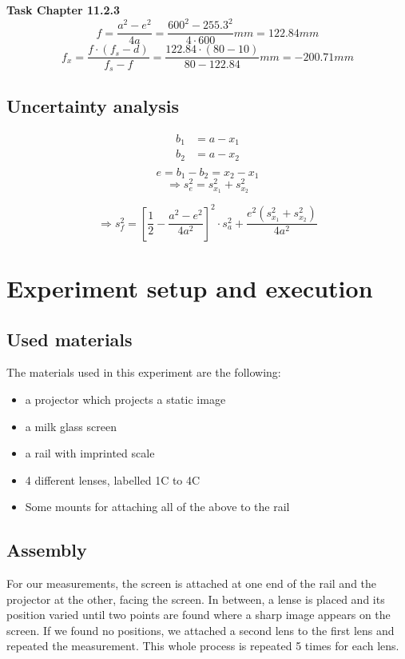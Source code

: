 \documentclass{scrreprt}
\begin{document}
\textbf{Task Chapter 11.2.3}
\begin{equation}
f = \frac{a^2-e^2}{4a} = \frac{600^2-255.3^2}{4\cdot 600}mm = 122.84mm
\end{equation}
\begin{equation}
f_x = \frac{f \cdot (f_s-d)}{f_s-f} = \frac{122.84\cdot (80-10)}{80-122.84}mm = -200.71mm
\end{equation}

\subsection{Uncertainty analysis}
\begin{align*}
b_1 &= a - x_1\\
b_2 &= a - x_2\\
\end{align*}
\[e = b_1 - b_2 = x_2 - x_1\]
\begin{equation}
\Longrightarrow s_e^2 = s_{x_1}^2 + s_{x_2}^2
\end{equation}

\begin{equation}
\Longrightarrow s_f^2 = \left[ \frac{1}{2} - \frac{a^2-e^2}{4 a^2} \right]^2 \cdot s_a^2 + \frac{e^2 \left( s_{x_1}^2 + s_{x_2}^2 \right)}{4  a^2}
\end{equation}

\section{Experiment setup and execution}

\subsection{Used materials}
The materials used in this experiment are the following:
\begin{itemize}
\item a projector which projects a static image
\item a milk glass screen
\item a rail with imprinted scale
\item 4 different lenses, labelled 1C to 4C
\item Some mounts for attaching all of the above to the rail
\end{itemize}
\subsection{Assembly}
For our measurements, the screen is attached at one end of the rail and the projector at the other, facing the screen. In between, a lense is placed and its position varied until two points are found where a sharp image appears on the screen. If we found no positions, we attached a second lens to the first lens and repeated the measurement. This whole process is repeated 5 times for each lens.
\end{document}
